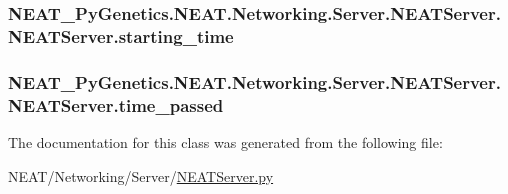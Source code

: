 \subsubsection[{\texorpdfstring{starting\+\_\+time}{starting_time}}]{\setlength{\rightskip}{0pt plus 5cm}N\+E\+A\+T\+\_\+\+Py\+Genetics.\+N\+E\+A\+T.\+Networking.\+Server.\+N\+E\+A\+T\+Server.\+N\+E\+A\+T\+Server.\+starting\+\_\+time\hspace{0.3cm}{\ttfamily [static]}}\hypertarget{classNEAT__PyGenetics_1_1NEAT_1_1Networking_1_1Server_1_1NEATServer_1_1NEATServer_abba58b32d9919608f5502e001dbd62dd}{}\label{classNEAT__PyGenetics_1_1NEAT_1_1Networking_1_1Server_1_1NEATServer_1_1NEATServer_abba58b32d9919608f5502e001dbd62dd}
\subsubsection[{\texorpdfstring{time\+\_\+passed}{time_passed}}]{\setlength{\rightskip}{0pt plus 5cm}N\+E\+A\+T\+\_\+\+Py\+Genetics.\+N\+E\+A\+T.\+Networking.\+Server.\+N\+E\+A\+T\+Server.\+N\+E\+A\+T\+Server.\+time\+\_\+passed\hspace{0.3cm}{\ttfamily [static]}}\hypertarget{classNEAT__PyGenetics_1_1NEAT_1_1Networking_1_1Server_1_1NEATServer_1_1NEATServer_acbbd8416ba0d7139131ff0e553b20c3d}{}\label{classNEAT__PyGenetics_1_1NEAT_1_1Networking_1_1Server_1_1NEATServer_1_1NEATServer_acbbd8416ba0d7139131ff0e553b20c3d}


The documentation for this class was generated from the following file\+:\begin{DoxyCompactItemize}
\item 
N\+E\+A\+T/\+Networking/\+Server/\hyperlink{NEATServer_8py}{N\+E\+A\+T\+Server.\+py}\end{DoxyCompactItemize}
